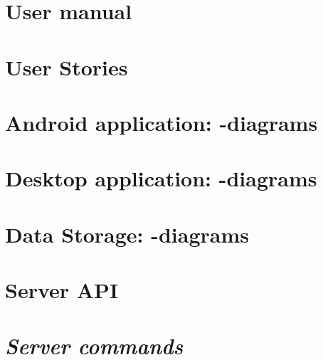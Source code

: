 \begin{appendix}

\chapter{User manual}


\chapter{User Stories}

\newpage
\chapter{Android application: -diagrams}


\chapter{Desktop application: -diagrams}
\label{chap:des_appendix}


\chapter{Data Storage: -diagrams}
\label{chap:dat_umls}


\chapter{Server API}


\chapter{\textit{Server commands}}

\begin{comment}
%

%


\end{comment}
\end{appendix}
